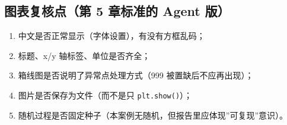 \begin{Shaded}
\begin{Highlighting}[]
\NormalTok{(}\NormalTok{, }
\NormalTok{(}\OperatorTok{==} \NormalTok{)}
\NormalTok{(}\NormalTok{, }\NormalTok{(clean[}\NormalTok{].isna().}\NormalTok{()))}
\NormalTok{(}\NormalTok{, }\NormalTok{((clean[}\NormalTok{] }\OperatorTok{!=}\NormalTok{ clean[}\NormalTok{].}\NormalTok{()))}
\NormalTok{(}\NormalTok{, }\NormalTok{(clean[}\NormalTok{].unique().tolist()))}
\end{Highlighting}
\end{Shaded}

\begin{Shaded}
\begin{Highlighting}[]
\end{Highlighting}
\end{Shaded}

\subsection{图表复核点（第 5 章标准的 Agent
版）}\label{ux56feux8868ux590dux6838ux70b9ux7b2c-5-ux7ae0ux6807ux51c6ux7684-agent-ux7248}

\begin{enumerate}
\def\labelenumi{\arabic{enumi}.}
\tightlist
\item
  中文是否正常显示（字体设置），有没有方框乱码；
\item
  标题、x/y 轴标签、单位是否齐全；
\item
  箱线图是否说明了异常点处理方式（999 被置缺后不应再出现）；
\item
  图片是否保存为文件（而不是只 \texttt{plt.show()}）；
\item
  随机过程是否固定种子（本案例无随机，但报告里应体现''可复现''意识）。
\end{enumerate}

